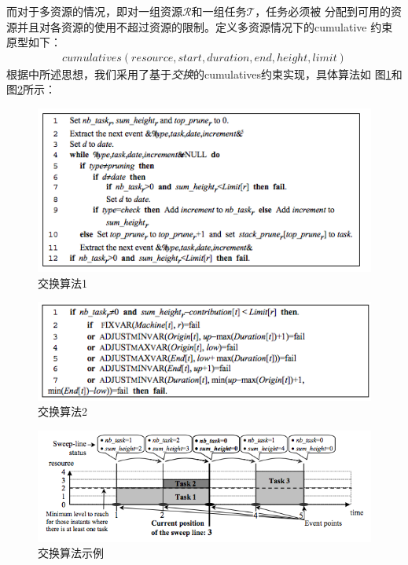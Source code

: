 \documentclass[UTF8，12pt]{ctexart}
\begin{document}
而对于多资源的情况，即对一组资源$\mathscr{R}$和一组任务$\mathscr{T}$，任务必须被
分配到可用的资源并且对各资源的使用不超过资源的限制。定义多资源情况下的cumulative
约束原型如下： 
	\begin{align*}
	cumulatives( resource, start, duration, end, height, limit)
	\end{align*}
根据\cite{cumulatives}中所述思想，我们采用了基于\textit{交换}的cumulatives约束实现，具体算法如
图\ref{al1_cum}和图\ref{al2_cum}所示：

\begin{figure}[h!]
	\includegraphics[width=\linewidth]{figure/al1_cum.png}
	\caption{交换算法1}
	\label{al1_cum}
\end{figure}

\begin{figure}[h!]
	\includegraphics[width=\linewidth]{figure/al2_cum.png}
	\caption{交换算法2}
	\label{al2_cum}
\end{figure}

\begin{figure}[h!]
	\includegraphics[width=\linewidth]{figure/illustrative_cum.png}
	\caption{交换算法示例}
	\label{ill_cum}
\end{figure}
\end{document}
